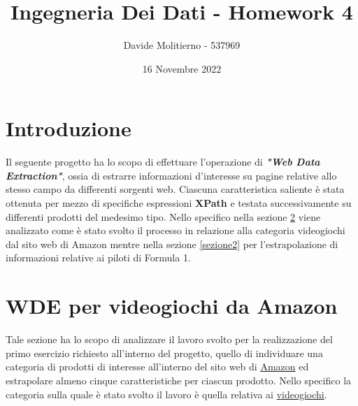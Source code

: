 \documentclass[12pt, letterpaper]{article}
\title{Ingegneria Dei Dati - Homework 4}
\author{Davide Molitierno - 537969}
\date{16 Novembre 2022}
\begin{document}
\maketitle

\section{Introduzione}
Il seguente progetto ha lo scopo di effettuare l'operazione di \emph{\textbf{"Web Data Extraction"}}, ossia di estrarre informazioni d'interesse su pagine relative allo stesso campo da differenti sorgenti web. Ciascuna caratteristica saliente è stata ottenuta per mezzo di specifiche espressioni \textbf{XPath} e testata successivamente su differenti prodotti del medesimo tipo.
Nello specifico nella sezione \ref{sezione1} viene analizzato come è stato svolto il processo in relazione alla categoria videogiochi dal sito web di Amazon mentre nella sezione \ref{sezione2} per l'estrapolazione di informazioni relative ai piloti di Formula 1.
\section{WDE per videogiochi da Amazon} \label{sezione1}
Tale sezione ha lo scopo di analizzare il lavoro svolto per la realizzazione del primo esercizio richiesto all'interno del progetto, quello di individuare una categoria di prodotti di interesse all'interno del sito web di \href{https://www.amazon.it}{Amazon} ed estrapolare almeno cinque caratteristiche per ciascun prodotto. Nello specifico la categoria sulla quale è stato svolto il lavoro è quella relativa ai \href{https://www.amazon.it/s/ref=nb_sb_noss?__mk_it_IT=ÅMÅŽÕÑ&url=search-alias%3Dvideogames&field-keywords=&crid=2GIVFOZXKUAZD&sprefix=%2Cvideogames%2C110}{videogiochi}.
\end{document}
